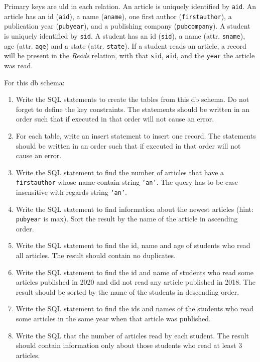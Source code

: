\documentclass[letterpaper, 11pt]{article}
\begin{document}
Primary keys are uld in each relation. An article is uniquely identified by \texttt{aid}. An article has an id (\texttt{aid}), a name (\texttt{aname}), one first author (\texttt{first\textunderscore author}), a publication year (\texttt{pubyear}), and a publishing company (\texttt{pubcompany}). A student is uniquely identified by \texttt{sid}. A student has an id (\texttt{sid}), a name (attr. \texttt{sname}), age (attr. \texttt{age}) and a state (attr. \texttt{state}). If a student reads an article, a record will be present in the \textit{Reads} relation, with that \texttt{sid}, \texttt{aid}, and the \texttt{year} the article was read.

For this db schema:
\begin{enumerate}[label={\alph*}),leftmargin=*]
    \item Write the SQL statements to create the tables from this db schema. Do not forget to define the key constraints. The statements should be written in an order such that if executed in that order will not cause an error.
    \item For each table, write an insert statement to insert one record. The statements should be written in an order such that if executed in that order will not cause an error.
    \item Write the SQL statement to find the number of articles that have a \texttt{first\textunderscore author} whose name contain string \texttt{`an'}. The query has to be case insensitive with regards string \texttt{`an'}.
    \item Write the SQL statement to find information about the newest articles (hint: \texttt{pubyear} is max). Sort the result by the name of the article in ascending order.
    \item Write the SQL statement to find the id, name and age of students who read all articles. The result should contain no duplicates.
    \item Write the SQL statement to find the id and name of students who read some articles published in 2020 and did not read any article published in 2018. The result should be sorted by the name of the students in descending order.
    \item Write the SQL statement to find the ids and names of the students who read some articles in the same year when that article was published.
    \item Write the SQL that the number of articles read by each student. The result should contain information only about those students who read at least 3 articles.

\end{enumerate}
\end{document}
